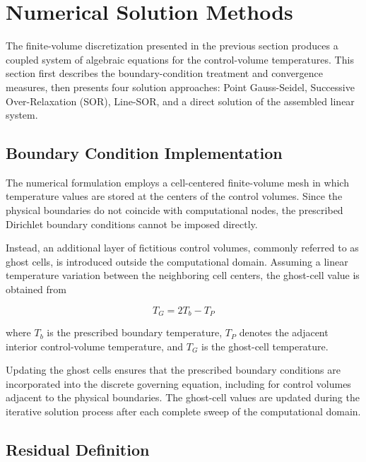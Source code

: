 \section{Numerical Solution Methods}

The finite-volume discretization presented in the previous section produces a coupled system of algebraic equations for the control-volume temperatures. This section first describes the boundary-condition treatment and convergence measures, then presents four solution approaches: Point Gauss-Seidel, Successive Over-Relaxation (SOR), Line-SOR, and a direct solution of the assembled linear system.


\subsection{Boundary Condition Implementation}

The numerical formulation employs a cell-centered finite-volume mesh in which temperature values are stored at the centers of the control volumes. Since the physical boundaries do not coincide with computational nodes, the prescribed Dirichlet boundary conditions cannot be imposed directly.

Instead, an additional layer of fictitious control volumes, commonly referred to as ghost cells, is introduced outside the computational domain. Assuming a linear temperature variation between the neighboring cell centers, the ghost-cell value is obtained from

\begin{equation}
T_G = 2T_b - T_P
\label{eq:ghost}
\end{equation}

where $T_b$ is the prescribed boundary temperature, $T_P$ denotes the adjacent interior control-volume temperature, and $T_G$ is the ghost-cell temperature.

Updating the ghost cells ensures that the prescribed boundary conditions are incorporated into the discrete governing equation, including for control volumes adjacent to the physical boundaries. The ghost-cell values are updated during the iterative solution process after each complete sweep of the computational domain.


\subsection{Residual Definition}

